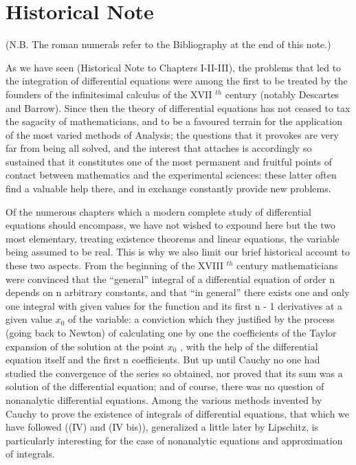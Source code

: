 \section*{Historical Note}
{}

(N.B. The roman numerals refer to the Bibliography at the end of this note.)

As we have seen (Historical Note to Chapters I-II-III), the problems that led to the integration of differential equations were among the first to be treated by the founders of the infinitesimal calculus of the XVII \(^{th}\) century (notably Descartes and Barrow). Since then the theory of differential equations has not ceased to tax the sagacity of mathematicians, and to be a favoured terrain for the application of the most varied methods of Analysis; the questions that it provokes are very far from being all solved, and the interest that attaches is accordingly so sustained that it constitutes one of the most permanent and fruitful points of contact between mathematics and the experimental sciences: these latter often find a valuable help there, and in exchange constantly provide new problems.

Of the numerous chapters which a modern complete study of differential equations should encompass, we have not wished to expound here but the two most elementary, treating existence theorems and linear equations, the variable being assumed to be real. This is why we also limit our brief historical account to these two aspects. From the beginning of the XVIII \(^{th}\) century mathematicians were convinced that the ``general'' integral of a differential equation of order n depends on n arbitrary constants, and that ``in general'' there exists one and only one integral with given values for the function and its first n - 1 derivatives at a given value \(x_{0}\) of the variable: a conviction which they justified by the process (going back to Newton) of calculating one by one the coefficients of the Taylor expansion of the solution at the point \(x_{0}\) , with the help of the differential equation itself and the first n coefficients. But up until Cauchy no one had studied the convergence of the series so obtained, nor proved that its sum was a solution of the differential equation; and of course, there was no question of nonanalytic differential equations. Among the various methods invented by Cauchy to prove the existence of integrals of differential equations, that which we have followed ((IV) and (IV bis)), generalized a little later by Lipschitz, is particularly interesting for the case of nonanalytic equations and approximation of integrals.

